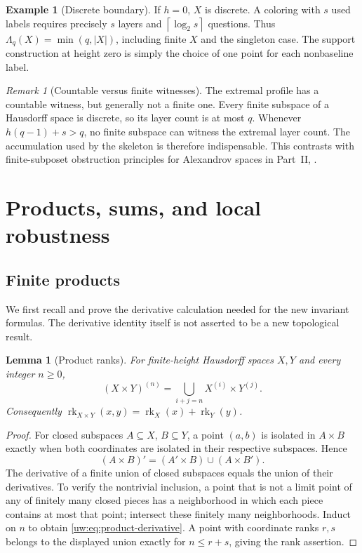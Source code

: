 \documentclass[11pt,letterpaper]{article}
\numberwithin{equation}{section}
\newtheorem{lemma}[lemma]{Lemma}
\theoremstyle{definition}
\newtheorem{example}[example]{Example}
\theoremstyle{remark}
\newtheorem{remark}[remark]{Remark}
\theoremstyle{definition}
\newcommand{\rk}{\operatorname{rk}}
\newcommand{\ceil}[1]{\left\lceil#1\right\rceil}
\begin{document}
\begin{example}[Discrete boundary]
If $h=0$, $X$ is discrete. A coloring with $s$ used labels requires precisely
$s$ layers and $\ceil{\log_2s}$ questions. Thus
$\Lambda_q(X)=\min(q,|X|)$, including finite $X$ and the singleton case.
The support construction at height zero is simply the choice of one point
for each nonbaseline label.
\end{example}

\begin{remark}[Countable versus finite witnesses]
The extremal profile has a countable witness, but generally not a finite
one. Every finite subspace of a Hausdorff space is discrete, so its layer
count is at most $q$. Whenever $h(q-1)+s>q$, no finite subspace can witness
the extremal layer count. The accumulation used by the skeleton is therefore
indispensable. This contrasts with finite-subposet obstruction principles
for Alexandrov spaces in Part~II, .
\end{remark}

\section{Products, sums, and local robustness}\label{uw:sec:products}

\subsection{Finite products}
We first recall and prove the derivative calculation needed for the new
invariant formulas. The derivative identity itself is not asserted to be a
new topological result.

\begin{lemma}[Product ranks]\label{uw:lem:product-rank}
For finite-height Hausdorff spaces $X,Y$ and every integer $n\ge0$,
\begin{equation}\label{uw:eq:product-derivative}
 (X\times Y)^{(n)}=\bigcup_{i+j=n}X^{(i)}\times Y^{(j)}.
\end{equation}
Consequently
$\rk_{X\times Y}(x,y)=\rk_X(x)+\rk_Y(y)$.
\end{lemma}
\begin{proof}
For closed subspaces $A\subseteq X$, $B\subseteq Y$, a point $(a,b)$ is
isolated in $A\times B$ exactly when both coordinates are isolated in their
respective subspaces. Hence
\[
 (A\times B)'=(A'\times B)\cup(A\times B').
\]
The derivative of a finite union of closed subspaces equals the union of
their derivatives. To verify the nontrivial inclusion, a point that is not a
limit point of any of finitely many closed pieces has a neighborhood in which
each piece contains at most that point; intersect these finitely many
neighborhoods. Induct on $n$ to obtain \eqref{uw:eq:product-derivative}.
A point with coordinate ranks $r,s$ belongs to the displayed union exactly
for $n\le r+s$, giving the rank assertion.
\end{proof}
\end{document}
